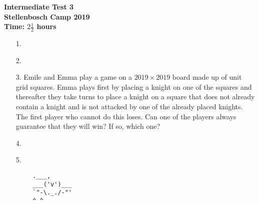 \documentclass{article}
\begin{document}
	\thispagestyle{empty}
	
	\begin{center}
		\textbf{\Large Intermediate Test 3}
		\\ \vspace{1em}
		\textbf{\large Stellenbosch Camp 2019}
		\\ \vspace{1em}
		\textbf{\large Time: $2\frac{1}{2}$ hours}
	\end{center}
	
	\vspace{6.81mm}
	
	\begin{enumerate}[1.]
		\item[1.]
		\vspace{6.81mm}

		\item[2.]
		\vspace{6.81mm}

		\item[3.] %
		Emile and Emma play a game on a $2019 \times 2019$ board made up of unit grid squares. Emma plays first by placing a knight on one of the squares and thereafter they take turns to place a knight on a square that does not already contain a knight and is not attacked by one of the already placed knights. The first player who cannot do this loses. Can one of the players always guarantee that they will win? If so, which one? 
		\vspace{6.81mm}
		
		\item[4.] %
		\vspace{6.81mm}
		
		\item[5.]
			
	\end{enumerate}
	
	
	\vfill
	\begin{center}
		\begin{BVerbatim}
		.___,   
		___('v')___
		`"-\._./-"'
		^ ^ 
		
		\end{BVerbatim}
	\end{center}
	
\end{document}
